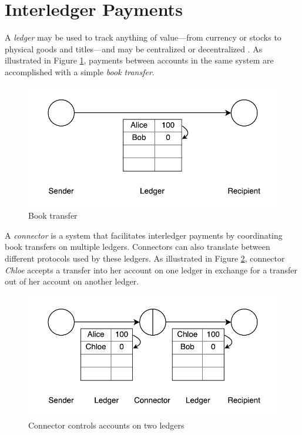 \documentclass[letterpaper,twocolumn,10pt]{article}
\begin{document}
\section{Interledger Payments}
\label{sec:model}

A \textit{ledger} may be used to track anything of value---from currency or stocks to physical goods and titles---and may be centralized or decentralized \cite{Bitcoin}. As illustrated in Figure \ref{fig:three-bells}, payments between accounts in the same system are accomplished with a simple \textit{book transfer}.

\begin{figure}[ht]
    \centering
    \includegraphics[width=\columnwidth]{figures/three-bells.pdf}
    \caption{Book transfer}
    \label{fig:three-bells}
\end{figure}

A \textit{connector} is a system that facilitates interledger payments by coordinating book transfers on multiple ledgers. Connectors can also translate between different protocols used by these ledgers. As illustrated in Figure \ref{fig:connector}, connector \textit{Chloe} accepts a transfer into her account on one ledger in exchange for a transfer out of her account on another ledger. 

\begin{figure}[ht]
    \centering
    \includegraphics[width=\columnwidth]{figures/connector.pdf}
    \caption{Connector controls accounts on two ledgers}
    \label{fig:connector}
\end{figure}
\end{document}

